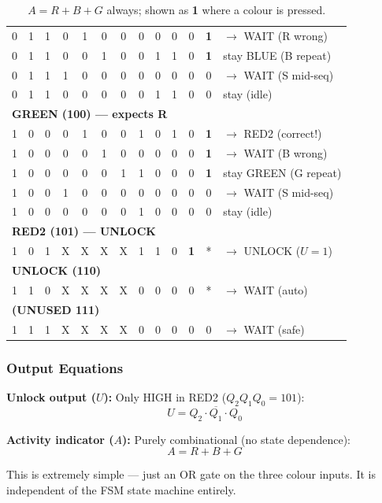 \documentclass[12pt,a4paper]{article}
\begin{document}
\begin{table}[H]
\begin{tabular}{ccc|cccc|ccc|cc|l}
0&1&1 & 0&1&0&0 & 0&0&0 & 0&\textbf{1} & $\to$ WAIT (R wrong) \\
0&1&1 & 0&0&1&0 & 0&1&1 & 0&\textbf{1} & stay BLUE (B repeat) \\
0&1&1 & 1&0&0&0 & 0&0&0 & 0&0 & $\to$ WAIT (S mid-seq) \\
0&1&1 & 0&0&0&0 & 0&1&1 & 0&0 & stay (idle) \\
\midrule
\multicolumn{13}{l}{\cellcolor{green!8}\textbf{GREEN (100) --- expects R}} \\
1&0&0 & 0&1&0&0 & 1&0&1 & 0&\textbf{1} & $\to$ RED2 (correct!) \\
1&0&0 & 0&0&1&0 & 0&0&0 & 0&\textbf{1} & $\to$ WAIT (B wrong) \\
1&0&0 & 0&0&0&1 & 1&0&0 & 0&\textbf{1} & stay GREEN (G repeat) \\
1&0&0 & 1&0&0&0 & 0&0&0 & 0&0 & $\to$ WAIT (S mid-seq) \\
1&0&0 & 0&0&0&0 & 1&0&0 & 0&0 & stay (idle) \\
\midrule
\multicolumn{13}{l}{\cellcolor{purple!8}\textbf{RED2 (101) --- UNLOCK}} \\
1&0&1 & X&X&X&X & 1&1&0 & \textbf{1}&* & $\to$ UNLOCK ($U\!=\!1$) \\
\midrule
\multicolumn{13}{l}{\cellcolor{gold!10}\textbf{UNLOCK (110)}} \\
1&1&0 & X&X&X&X & 0&0&0 & 0&* & $\to$ WAIT (auto) \\
\midrule
\multicolumn{13}{l}{\cellcolor{gray!10}\textbf{(UNUSED 111)}} \\
1&1&1 & X&X&X&X & 0&0&0 & 0&0 & $\to$ WAIT (safe) \\
\bottomrule
\end{tabular}
\caption*{\small * $A = R+B+G$ always; shown as \textbf{1} where a colour is pressed.}
\end{table}

\subsubsection{Output Equations}

\begin{tipbox}
\textbf{Unlock output ($U$):} Only HIGH in RED2 ($Q_2 Q_1 Q_0 = 101$):
$$\boxed{U = Q_2 \cdot \overline{Q_1} \cdot Q_0}$$

\textbf{Activity indicator ($A$):} Purely combinational (no state dependence):
$$\boxed{A = R + B + G}$$

This is extremely simple --- just an OR gate on the three colour inputs. It is independent of the FSM state machine entirely.
\end{tipbox}
\end{document}
